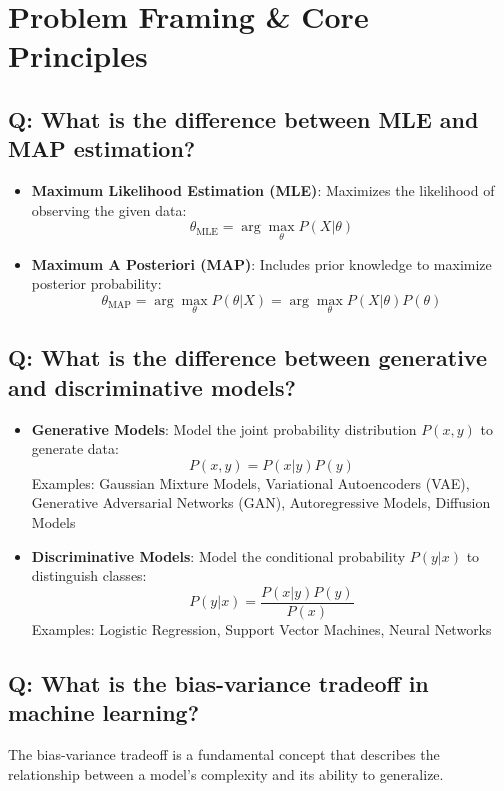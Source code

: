 \section{Problem Framing \& Core Principles}

\subsection*{\textcolor{primaryteal}{Q: What is the difference between MLE and MAP estimation?}}
\begin{itemize}
	\item \textbf{Maximum Likelihood Estimation (MLE)}: Maximizes the likelihood of observing the given data:
	      \[
		      \theta_{\text{MLE}} = \arg\max_{\theta} P(X|\theta)
	      \]
	\item \textbf{Maximum A Posteriori (MAP)}: Includes prior knowledge to maximize posterior probability:
	      \[
		      \theta_{\text{MAP}} = \arg\max_{\theta} P(\theta|X) = \arg\max_{\theta} P(X|\theta)P(\theta)
	      \]
\end{itemize}

\subsection*{\textcolor{primaryteal}{Q: What is the difference between generative and discriminative models?}}
\begin{itemize}
	\item \textbf{Generative Models}: Model the joint probability distribution $P(x, y)$ to generate data:
	      \[
		      P(x, y) = P(x|y)P(y)
	      \]
	      Examples: Gaussian Mixture Models, Variational Autoencoders (VAE), Generative Adversarial Networks (GAN), Autoregressive Models, Diffusion Models

	\item \textbf{Discriminative Models}: Model the conditional probability $P(y|x)$ to distinguish classes:
	      \[
		      P(y|x) = \frac{P(x|y)P(y)}{P(x)}
	      \]
	      Examples: Logistic Regression, Support Vector Machines, Neural Networks
\end{itemize}

\subsection*{\textcolor{primaryteal}{Q: What is the bias-variance tradeoff in machine learning?}}
The bias-variance tradeoff is a fundamental concept that describes the relationship between a model's complexity and its ability to generalize.

